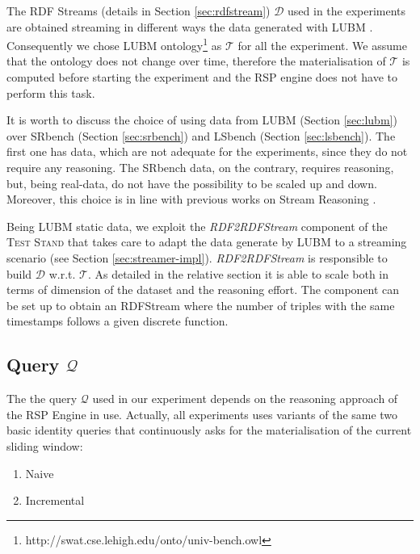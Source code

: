The RDF Streams (details in Section \ref{sec:rdfstream}) $\mathcal{D}$ used in the experiments are obtained streaming in different ways the data generated with LUBM  \cite{Guo2005}. Consequently we chose LUBM ontology\footnote{http://swat.cse.lehigh.edu/onto/univ-bench.owl} as $\mathcal{T}$ for all the experiment. We assume that the ontology does not change over time, therefore the materialisation of $\mathcal{T}$ is computed before starting the experiment and the RSP engine does not have to perform this task. 

It is worth to discuss the choice of using data from LUBM (Section \ref{sec:lubm}) over SRbench (Section \ref{sec:srbench}) and LSbench (Section \ref{sec:lsbench}). The first one has data, which are not adequate for the experiments, since they do not require any reasoning. The SRbench data, on the contrary, requires reasoning, but, being real-data, do not have the possibility to be scaled up and down. Moreover, this choice is in line with previous works on Stream Reasoning \cite{DBLP:conf/semweb/UrbaniMJHB13}. 

Being LUBM static data, we exploit the \textit{RDF2RDFStream} component of the \textsc{Test Stand} that takes care to adapt the data generate by LUBM to a streaming scenario (see Section \ref{sec:streamer-impl}). \textit{RDF2RDFStream} is responsible to build $\mathcal{D}$ w.r.t. $\mathcal{T}$. As detailed in the relative section it is able to scale both in terms of dimension of the dataset and the reasoning effort. The component can be set up to obtain an RDFStream where the number of triples with the same timestamps follows a given discrete function. %

\subsection{Query $\mathcal{Q}$}\label{sec:query}
 
The the query $\mathcal{Q}$ used in our experiment depends on the reasoning approach of the RSP Engine in use. Actually, all  experiments uses variants of the same two basic identity queries that continuously asks for the materialisation of the current sliding window:

\begin{enumerate}
\item[Q.1] Naive
\item[Q.2] Incremental
\end{enumerate}
 		 
